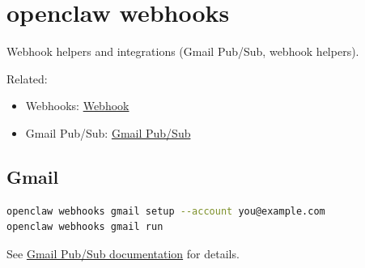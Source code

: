 \clearpage

\section{openclaw webhooks}


Webhook helpers and integrations (Gmail Pub/Sub, webhook helpers).

Related:

\begin{itemize}
  \item Webhooks: \href{/automation/webhook}{Webhook}
  \item Gmail Pub/Sub: \href{/automation/gmail-pubsub}{Gmail Pub/Sub}
\end{itemize}


\subsection{Gmail}


\begin{lstlisting}[language=bash]
openclaw webhooks gmail setup --account you@example.com
openclaw webhooks gmail run
\end{lstlisting}


See \href{/automation/gmail-pubsub}{Gmail Pub/Sub documentation} for details.


\clearpage
